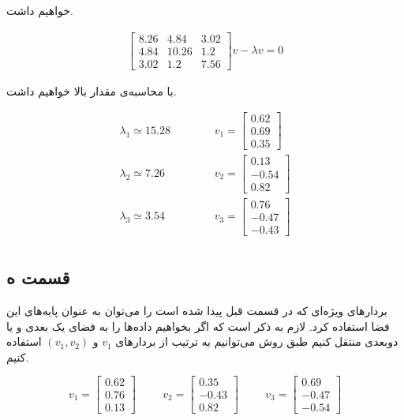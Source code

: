 \documentclass{article}
\begin{document}
خواهیم داشت.

\begin{eqnarray*}
    \begin{bmatrix}8.26 & 4.84 & 3.02\\4.84 & 10.26 & 1.2\\3.02 & 1.2 & 7.56\end{bmatrix}v - \lambda v = 0
\end{eqnarray*}

با محاسبه‌ی مقدار بالا خواهیم داشت.

\begin{eqnarray*}
    \lambda_1 \simeq 15.28 & \hspace{1cm} & v_1 = \begin{bmatrix}0.62\\ 0.69\\ 0.35\end{bmatrix}\\
    \lambda_2 \simeq 7.26 & \hspace{1cm} & v_2 = \begin{bmatrix}0.13\\ -0.54\\ 0.82\end{bmatrix}\\
    \lambda_3 \simeq 3.54 & \hspace{1cm} & v_3 = \begin{bmatrix}0.76\\ -0.47\\ -0.43\end{bmatrix}\\
\end{eqnarray*}

\subsection*{قسمت ه}

بردار‌های ویژه‌ای که در قسمت قبل پیدا شده است را می‌توان به عنوان پا‌یه‌های این فضا استفاده کرد. لازم به ذکر است که
اگر بخواهیم داده‌ها را به فضای یک بعدی و یا دوبعدی منتقل کنیم طبق روش  می‌توانیم به ترتیب از
بردار‌های $v_1$ و $(v_1, v_2)$ استفاده کنیم.

$$v_1 = \begin{bmatrix}0.62\\ 0.76\\ 0.13\end{bmatrix} \hspace{1cm} v_2 = \begin{bmatrix}0.35\\ -0.43\\ 0.82\end{bmatrix} \hspace{1cm} v_3 = \begin{bmatrix}0.69\\ -0.47\\ -0.54\end{bmatrix}$$
\end{document}
